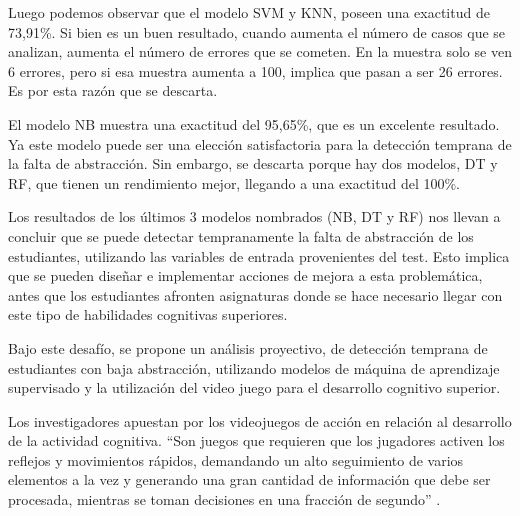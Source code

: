 \documentclass{textolivre}
\begin{document}
Luego podemos observar que el modelo SVM y KNN, poseen una exactitud de 73,91\%. Si bien es un buen resultado, cuando aumenta el número de casos que se analizan, aumenta el número de errores que se cometen. En la muestra solo se ven 6 errores, pero si esa muestra aumenta a 100, implica que pasan a ser 26 errores. Es por esta razón que se descarta.

El modelo NB muestra una exactitud del 95,65\%, que es un excelente resultado. Ya este modelo puede ser una elección satisfactoria para la detección temprana de la falta de abstracción. Sin embargo, se descarta porque hay dos modelos, DT y RF, que tienen un rendimiento mejor, llegando a una exactitud del 100\%.

Los resultados de los últimos 3 modelos nombrados (NB, DT y RF) nos llevan a concluir que se puede detectar tempranamente la falta de abstracción de los estudiantes, utilizando las variables de entrada provenientes del test. Esto implica que se pueden diseñar e implementar acciones de mejora a esta problemática, antes que los estudiantes afronten asignaturas donde se hace necesario llegar con este tipo de habilidades cognitivas superiores.  

Bajo este desafío, se propone un análisis proyectivo, de detección temprana de estudiantes con baja abstracción, utilizando modelos de máquina de aprendizaje supervisado y la utilización del video juego para el desarrollo cognitivo superior.

Los investigadores apuestan por los videojuegos de acción en relación al desarrollo de la actividad cognitiva. “Son juegos que requieren que los jugadores activen los reflejos y movimientos rápidos, demandando un alto seguimiento de varios elementos a la vez y generando una gran cantidad de información que debe ser procesada, mientras se toman decisiones en una fracción de segundo” \cite[p. 29]{moscardi2018}. %



\printbibliography\label{sec-bib}
\end{document}

